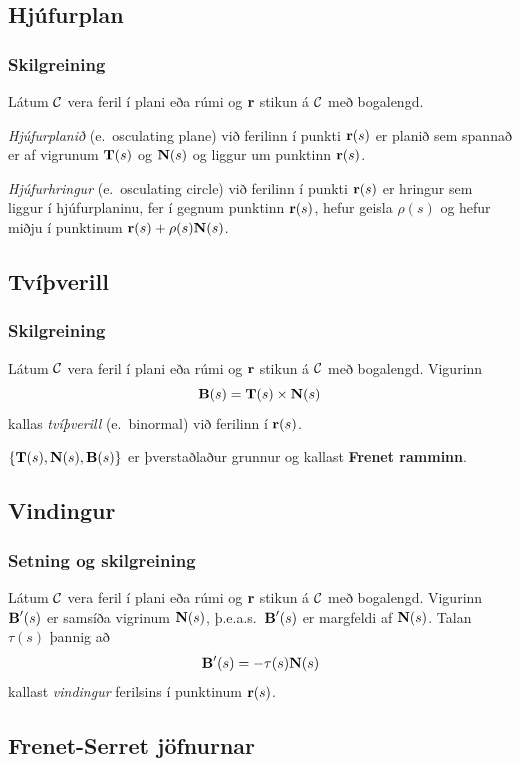 \subsection{Hjúfurplan}
 \subsubsection{Skilgreining }
   Látum $\cal C$ vera feril í plani eða rúmi og $\mbox{${\bf r}$}$ stikun á $\cal C$ með bogalengd.  

{\em Hjúfurplanið} (e.~osculating plane) við ferilinn í punkti $\mbox{${\bf r}$}(s)$ er planið sem spannað er af  vigrunum $\mbox{${\bf T}$}(s)$ og $\mbox{${\bf N}$}(s)$ og liggur um punktinn $\mbox{${\bf r}$}(s)$.

{\em Hjúfurhringur} (e.~osculating circle) við ferilinn í punkti
$\mbox{${\bf r}$}(s)$ er hringur sem liggur í hjúfurplaninu, fer í gegnum punktinn
$\mbox{${\bf r}$}(s)$, hefur geisla $\rho(s)$ og hefur miðju í punktinum
$\mbox{${\bf r}$}(s)+\rho(s)\mbox{${\bf N}$}(s)$. 
 



\subsection{Tvíþverill}
 \subsubsection{Skilgreining }
   Látum $\cal C$ vera feril í plani eða rúmi og
$\mbox{${\bf r}$}$ stikun á $\cal C$ með bogalengd.  Vigurinn  
$$\mbox{${\bf B}$}(s)=\mbox{${\bf T}$}(s)\times \mbox{${\bf N}$}(s)$$
kallas {\em tvíþverill} (e.~binormal) við ferilinn í $\mbox{${\bf r}$}(s)$.
 

 \bigskip
 $\{\mbox{${\bf T}$}(s),\mbox{${\bf N}$}(s),\mbox{${\bf B}$}(s)\}$ er þverstaðlaður grunnur og kallast \textbf{Frenet ramminn}.


\subsection{Vindingur}
 \subsubsection{Setning og skilgreining }
  Látum $\cal C$ vera feril í plani
eða rúmi og $\mbox{${\bf r}$}$ stikun á $\cal C$ með bogalengd.  Vigurinn $\mbox{${\bf B}$}'(s)$ er
samsíða vigrinum $\mbox{${\bf N}$}(s)$, þ.e.a.s.~$\mbox{${\bf B}$}'(s)$ er margfeldi af $\mbox{${\bf N}$}(s)$.
Talan $\tau(s)$ þannig að  
$$\mbox{${\bf B}$}'(s)=-\tau(s)\mbox{${\bf N}$}(s)$$
kallast {\em vindingur} ferilsins í punktinum $\mbox{${\bf r}$}(s)$.

 




\subsection{Frenet-Serret jöfnurnar}
